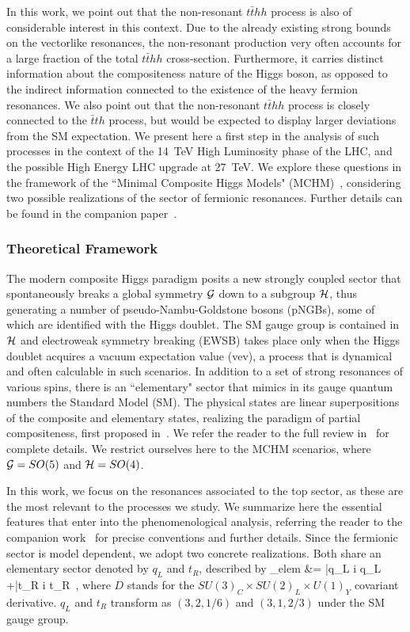 In this work, we point out that the non-resonant ${t\bar t}hh$ process
is also of considerable interest in this context.  Due to the already
existing strong bounds on the vectorlike resonances, the non-resonant
production very often accounts for a large fraction of the total
${t\bar t}hh$ cross-section.  Furthermore, it carries distinct
information about the compositeness nature of the Higgs boson, as
opposed to the indirect information connected to the existence of the
heavy fermion resonances.  We also point out that the non-resonant
${t\bar t}hh$ process is closely connected to the ${\bar t}th$
process, but would be expected to display larger deviations from the
SM expectation.  We present here a first step in the analysis of such
processes in the context of the 14~TeV High Luminosity phase of the
LHC, and the possible High Energy LHC upgrade at 27~TeV. We explore
these questions in the framework of the ``Minimal Composite Higgs
Models" (MCHM)~\cite{Agashe:2004rs}, considering two possible
realizations of the sector of fermionic resonances.  Further details
can be found in the companion paper~\cite{MCHMtthh}.

\subsubsection{Theoretical Framework}
\label{MCHM}

The modern composite Higgs paradigm posits a new strongly coupled
sector that spontaneously breaks a global symmetry ${\cal G}$ down to
a subgroup ${\cal H}$, thus generating a number of
pseudo-Nambu-Goldstone bosons (pNGBs), some of which are identified
with the Higgs doublet.  The SM gauge group is contained in ${\cal H}$
and electroweak symmetry breaking (EWSB) takes place only when the Higgs
doublet acquires a vacuum expectation value (vev), a process that is
dynamical and often calculable in such scenarios.  In addition to a
set of strong resonances of various spins, there is an ``elementary"
sector that mimics in its gauge quantum numbers the Standard Model
(SM).  The physical states are linear superpositions of the composite
and elementary states, realizing the paradigm of partial
compositeness, first proposed in~\cite{KAPLAN1991259}.  We refer the
reader to the full review in~\cite{Panico:2015jxa} for complete
details.  We restrict ourselves here to the MCHM scenarios, where
${\cal G} = SO(5)$ and ${\cal H} = SO(4)$.

In this work, we focus on the resonances associated to the top sector,
as these are the most relevant to the processes we study.  We
summarize here the essential features that enter into the
phenomenological analysis, referring the reader to the companion
work~\cite{MCHMtthh} for precise conventions and further details.
Since the fermionic sector is model dependent, we adopt two concrete
realizations.  Both share an elementary sector denoted by $q_L$ and
$t_R$, described by
%
\bea
{}_{\rm elem} &= \bar{q}_L i  q_L +\bar{t}_R i  t_R~,
\label{elem}
\eea
%
where $D$ stands for the $SU(3)_C \times SU(2)_L \times U(1)_Y$
covariant derivative.  $q_L$ and $t_R$ transform as $(3,2,1/6)$ and
$(3,1,2/3)$ under the SM gauge group.


